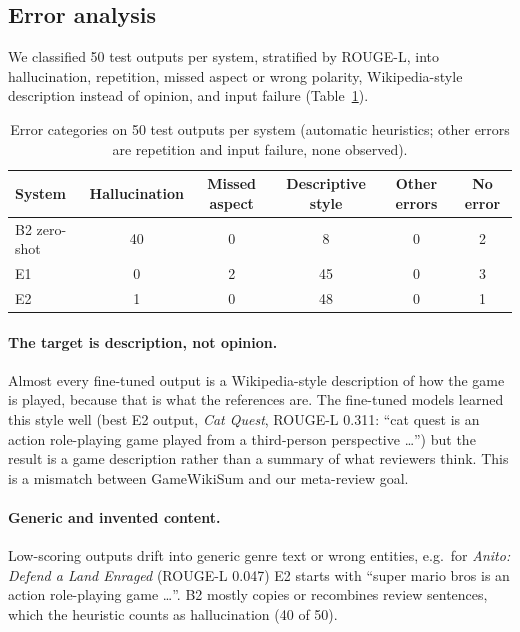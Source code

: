 \documentclass[11pt,a4paper]{article}
\begin{document}
\subsection{Error analysis}

We classified 50 test outputs per system, stratified by ROUGE-L, into hallucination,
repetition, missed aspect or wrong polarity, Wikipedia-style description instead of opinion,
and input failure (Table~\ref{tab:t3errors}).

\begin{table}[t]
  \centering
  \small
  \begin{tabular}{lccccc}
    \toprule
    System & Hallucination & Missed aspect & Descriptive style & Other errors & No error \\
    \midrule
    B2 zero-shot & 40 & 0 & 8 & 0 & 2 \\
    E1 & 0 & 2 & 45 & 0 & 3 \\
    E2 & 1 & 0 & 48 & 0 & 1 \\
    \bottomrule
  \end{tabular}
  \caption{Error categories on 50 test outputs per system (automatic heuristics; other errors
  are repetition and input failure, none observed).}
  \label{tab:t3errors}
\end{table}

\paragraph{The target is description, not opinion.} Almost every fine-tuned output is a
Wikipedia-style description of how the game is played, because that is what the references
are. The fine-tuned models learned this style well (best E2 output, \emph{Cat Quest},
ROUGE-L 0.311: ``cat quest is an action role-playing game played from a third-person
perspective \dots'') but the result is a game description rather than a summary of what
reviewers think. This is a mismatch between GameWikiSum and our meta-review goal.

\paragraph{Generic and invented content.} Low-scoring outputs drift into generic genre text
or wrong entities, e.g.\ for \emph{Anito: Defend a Land Enraged} (ROUGE-L 0.047) E2 starts with
``super mario bros is an action role-playing game \dots''. B2 mostly copies or recombines review
sentences, which the heuristic counts as hallucination (40 of 50).
\end{document}
